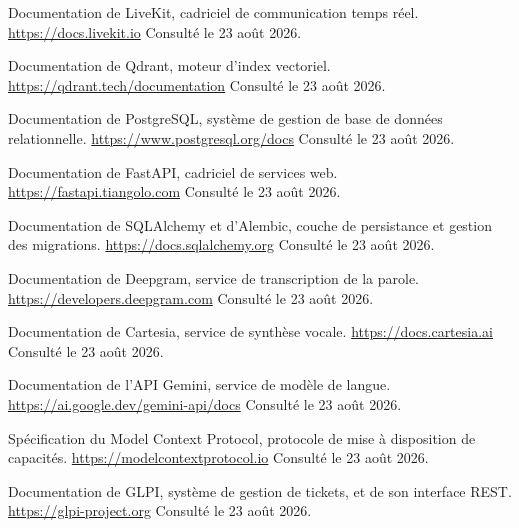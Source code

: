 \begin{description}\setlength{\itemsep}{0.4ex}

\item[{[N1]}] Documentation de LiveKit, cadriciel de communication temps réel.
\url{https://docs.livekit.io} \newline Consulté le 23 août 2026.

\item[{[N2]}] Documentation de Qdrant, moteur d'index vectoriel.
\url{https://qdrant.tech/documentation} \newline Consulté le 23 août 2026.

\item[{[N3]}] Documentation de PostgreSQL, système de gestion de base de données relationnelle.
\url{https://www.postgresql.org/docs} \newline Consulté le 23 août 2026.

\item[{[N4]}] Documentation de FastAPI, cadriciel de services web.
\url{https://fastapi.tiangolo.com} \newline Consulté le 23 août 2026.

\item[{[N5]}] Documentation de SQLAlchemy et d'Alembic, couche de persistance et gestion des
migrations. \url{https://docs.sqlalchemy.org} \newline Consulté le 23 août 2026.

\item[{[N6]}] Documentation de Deepgram, service de transcription de la parole.
\url{https://developers.deepgram.com} \newline Consulté le 23 août 2026.

\item[{[N7]}] Documentation de Cartesia, service de synthèse vocale.
\url{https://docs.cartesia.ai} \newline Consulté le 23 août 2026.

\item[{[N8]}] Documentation de l'API Gemini, service de modèle de langue.
\url{https://ai.google.dev/gemini-api/docs} \newline Consulté le 23 août 2026.

\item[{[N9]}] Spécification du Model Context Protocol, protocole de mise à disposition de
capacités. \url{https://modelcontextprotocol.io} \newline Consulté le 23 août 2026.

\item[{[N10]}] Documentation de GLPI, système de gestion de tickets, et de son interface REST.
\url{https://glpi-project.org} \newline Consulté le 23 août 2026.


\end{description}
